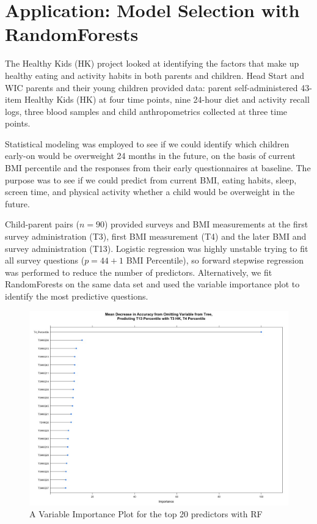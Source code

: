 \documentclass[11pt]{article}
\begin{document}
\section*{Application: Model Selection with RandomForests}
The Healthy Kids (HK) project looked at identifying the factors that make up healthy eating and activity habits in both parents and children. Head Start and WIC parents and their young children provided data: parent self-administered 43-item Healthy Kids (HK) at four time points, nine 24-hour diet and activity recall logs, three blood samples and child anthropometrics collected at three time points. 

Statistical modeling was employed to see if we could identify which children early-on would be overweight 24 months in the future, on the basis of current BMI percentile and the responses from their early questionnaires at baseline. The purpose was to see if we could predict from current BMI, eating habits, sleep, screen time, and physical activity whether a child would be overweight in the future.

Child-parent pairs ($n=90$) provided surveys and BMI measurements at the first survey administration (T3), first BMI measurement (T4) and the later BMI and survey administration (T13). Logistic regression was highly unstable trying to fit all survey questions ($p=44+1$ BMI Percentile), so forward stepwise regression was performed to reduce the number of predictors. Alternatively, we fit RandomForests on the same data set and used the variable importance plot to identify the most predictive questions.

\begin{figure}[H] \center
\includegraphics[scale=.4]{../Figures/HKVarImpPlot.jpeg} 
\caption{A Variable Importance Plot for the top 20 predictors with RF}
\end{figure}
\end{document}
